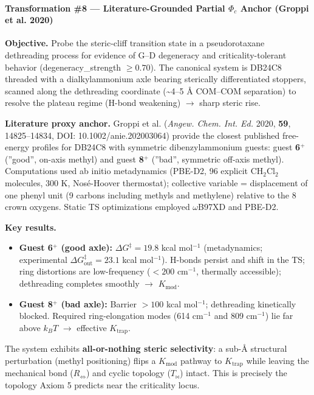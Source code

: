 \documentclass[12pt,a4paper]{article}
\begin{document}
\paragraph{Transformation \#8 --- Literature-Grounded Partial $\Phi_c$ Anchor (Groppi et al. 2020)}

\textbf{Objective.} Probe the steric-cliff transition state in a pseudorotaxane dethreading process for evidence of G--D degeneracy and criticality-tolerant behavior (degeneracy\_strength $\geq 0.70$). The canonical system is DB24C8 threaded with a dialkylammonium axle bearing sterically differentiated stoppers, scanned along the dethreading coordinate (\textasciitilde{}4--5 Å COM--COM separation) to resolve the plateau regime (H-bond weakening) $\to$ sharp steric rise.

\textbf{Literature proxy anchor.} Groppi et al. (\emph{Angew. Chem. Int. Ed.} 2020, \textbf{59}, 14825--14834, DOI: 10.1002/anie.202003064) provide the closest published free-energy profiles for DB24C8 with symmetric dibenzylammonium guests: guest \textbf{6}$^+$ (''good'', on-axis methyl) and guest \textbf{8}$^+$ (''bad'', symmetric off-axis methyl). Computations used ab initio metadynamics (PBE-D2, 96 explicit CH$_2$Cl$_2$ molecules, 300 K, Nosé-Hoover thermostat); collective variable = displacement of one phenyl unit (9 carbons including methyls and methylene) relative to the 8 crown oxygens. Static TS optimizations employed $\omega$B97XD and PBE-D2.

\textbf{Key results.}

\begin{itemize}
    \item \textbf{Guest 6$^+$ (good axle):} $\Delta G^\ddagger = 19.8$ kcal mol$^{-1}$ (metadynamics; experimental $\Delta G^\ddagger_\text{out} = 23.1$ kcal mol$^{-1}$). H-bonds persist and shift in the TS; ring distortions are low-frequency ($< 200$ cm$^{-1}$, thermally accessible); dethreading completes smoothly $\to$ $K_\text{mod}$.
    \item \textbf{Guest 8$^+$ (bad axle):} Barrier $> 100$ kcal mol$^{-1}$; dethreading kinetically blocked. Required ring-elongation modes (614 cm$^{-1}$ and 809 cm$^{-1}$) lie far above $k_BT$ $\to$ effective $K_\text{trap}$.
\end{itemize}

The system exhibits \textbf{all-or-nothing steric selectivity}: a sub-Å structural perturbation (methyl positioning) flips a $K_\text{mod}$ pathway to $K_\text{trap}$ while leaving the mechanical bond ($R_{\Leftrightarrow}$) and cyclic topology ($T_{\bowtie}$) intact. This is precisely the topology Axiom 5 predicts near the criticality locus.
\end{document}
